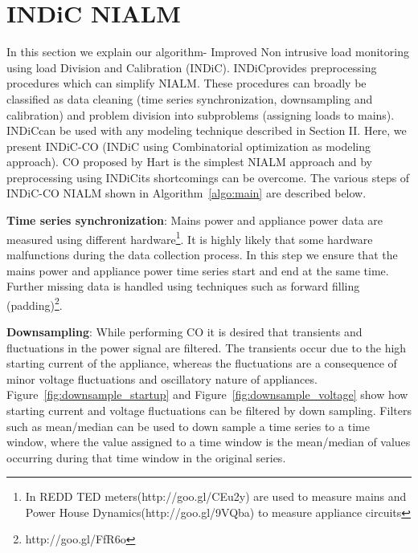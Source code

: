 \documentclass[conference]{IEEEtran}
\newcommand{\figref}[1]{Figure~\ref{#1}}
\newcommand{\algoref}[1]{Algorithm~\ref{#1}}
\newcommand{\indic}{INDiC}
\begin{document}
\section{INDiC NIALM}
\noindent In this section we explain our algorithm- Improved Non intrusive load monitoring using load Division and Calibration (\indic). \indic provides preprocessing procedures which can simplify NIALM. These procedures can broadly be classified as data cleaning (time series synchronization, downsampling and calibration) and problem division into subproblems (assigning loads to mains). \indic can be used with any modeling technique described in Section II. Here, we present INDiC-CO (INDiC using Combinatorial optimization as modeling approach). CO proposed by Hart\cite{hart} is the simplest NIALM approach and by preprocessing using \indic  its shortcomings can be overcome. The various steps of INDiC-CO NIALM shown in \algoref{algo:main} are described below. 

\noindent\textbf{Time series synchronization}: Mains power and appliance power data are measured using different hardware\footnote{In REDD\cite{redd} TED meters(http://goo.gl/CEu2y) are used to measure mains and Power House Dynamics(http://goo.gl/9VQba) to measure appliance circuits}. It is highly likely that some hardware malfunctions during the data collection process. In this step we ensure that the mains power and appliance power time series start and end at the same time. Further missing data is handled using techniques such as forward filling (padding)\footnote{http://goo.gl/FfR6o}.

\noindent\textbf{Downsampling}: While performing CO it is desired that transients and fluctuations in the power signal are filtered\cite{hart}. The transients occur due to the high starting current of the appliance, whereas the fluctuations are a consequence of minor voltage fluctuations and oscillatory nature of appliances. \figref{fig:downsample_startup} and \figref{fig:downsample_voltage} show how starting current and voltage fluctuations can be filtered by down sampling. Filters such as mean/median can be used to down sample a time series to a time window, where the value assigned to a time window is the mean/median of values occurring during that time window in the original series.
\end{document}
